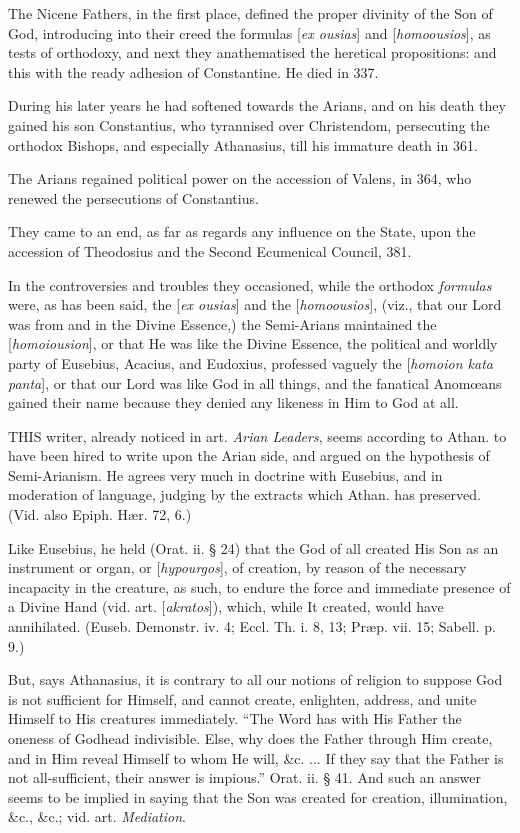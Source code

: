 The Nicene Fathers, in the first place, defined
the proper divinity of the Son of God, introducing into their creed
the formulas [\emph{ex ousias}] and [\emph{homoousios}], as tests of
orthodoxy, and next they anathematised the heretical propositions: and
this with the ready adhesion of Constantine. He died in 337.

During his later years he had softened towards
the Arians, and on his death they gained his son Constantius, who
tyrannised over Christendom, persecuting the orthodox Bishops, and
especially Athanasius, till his immature death in 361.

The Arians regained political power on the
accession of Valens, in 364, who renewed the persecutions of
Constantius.

They came to an end, as far as regards any
influence on the State, upon the accession of Theodosius and the
Second Ecumenical Council, 381.

In the controversies and troubles they
occasioned, while the orthodox \emph{formulas} were, as has been said,
the [\emph{ex ousias}] and the [\emph{homoousios}], (viz., that our
Lord was from and in the Divine Essence,) the Semi-Arians maintained
the [\emph{homoiousion}], or that He was like the Divine Essence, the
political and worldly party of Eusebius, Acacius, and Eudoxius,
professed vaguely the [\emph{homoion kata panta}], or that our Lord
was like God in all things, and the fanatical Anomœans gained their
name because they denied any likeness in Him to God at all.


THIS
writer, already noticed in art. \emph{Arian Leaders}, seems according
to Athan. to have been hired to write upon the Arian side, and argued
on the hypothesis of Semi-Arianism. He agrees very much in doctrine
with Eusebius, and in moderation of language, judging by the extracts
which Athan. has preserved. (Vid. also Epiph. Hær. 72, 6.)

Like Eusebius, he held (Orat. ii. § 24) that the
God of all created His Son as an instrument or organ, or [\emph{hypourgos}],
of creation, by reason of the necessary incapacity in the creature, as
such, to endure the force and immediate presence of a Divine Hand (vid.
art. [\emph{akratos}]), which, while It created, would have
annihilated. (Euseb. Demonstr. iv. 4; Eccl. Th. i. 8, 13; Præp. vii.
15; Sabell. p. 9.)

But, says Athanasius, it is contrary to all our
notions of religion to suppose God is not sufficient for Himself, and
cannot create, enlighten, address, and unite Himself to His creatures
immediately. ``The Word has with His Father the oneness of Godhead
indivisible. Else, why does the Father through Him create, and in Him
reveal Himself to whom He will, \&c. ... If they say that the
Father is not all-sufficient, their answer is impious.'' Orat. ii. §
41. And such an answer seems to be implied in saying that the Son
was created for creation, illumination, \&c., \&c.; vid. art. \emph{Mediation}.


